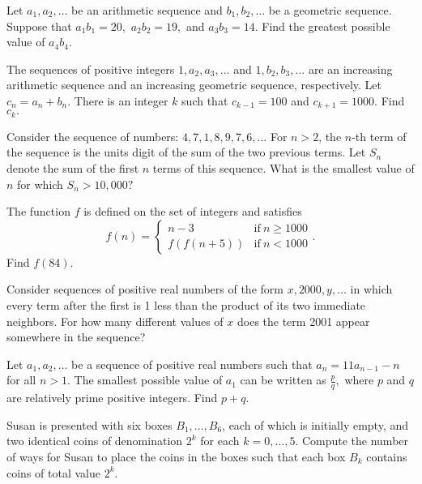 \documentclass[blue,onecol]{shooting}
\begin{document}
\begin{prob}[HMMT 2019]{3}
Let $a_1,a_2,\dots$ be an arithmetic sequence and $b_1,b_2,\dots$ be a geometric sequence. Suppose that $a_1b_1=20,$ $a_2b_2=19,$ and $a_3b_3=14.$ Find the greatest possible value of $a_4b_4.$
\end{prob}

\begin{prob}[AIME II 2016/9]{3}
The sequences of positive integers $1,a_2, a_3,...$ and $1,b_2, b_3,...$ are an increasing arithmetic sequence and an increasing geometric sequence, respectively. Let $c_n=a_n+b_n$. There is an integer $k$ such that $c_{k-1}=100$ and $c_{k+1}=1000$. Find $c_k.$
\end{prob}

\begin{prob}[AMC 12A 2002/21]{4}
Consider the sequence of numbers: $4,7,1,8,9,7,6,\dots$ For $n>2$, the $n$-th term of the sequence is the units digit of the sum of the two previous terms. Let $S_n$ denote the sum of the first $n$ terms of this sequence. What is the smallest value of $n$ for which $S_n>10,000?$
\end{prob}

\begin{prob}[AIME 1984/7]{4}
The function $f$ is defined on the set of integers and satisfies
\[f(n)=\begin{cases} n-3&\mbox{if}\ n\ge 1000\\ f(f(n+5))&\mbox{if}\ n<1000\end{cases}.\]
Find $f(84).$
\end{prob}
    
\begin{prob}[AMC 12A 2001/25]{4}
Consider sequences of positive real numbers of the form $x, 2000, y, \dots$ in which every term after the first is 1 less than the product of its two immediate neighbors. For how many different values of $x$ does the term 2001 appear somewhere in the sequence?
\end{prob}

\begin{req}[PUMaC 2017]{4}
Let $a_1,a_2,\dots$ be a sequence of positive real numbers such that $a_n=11a_{n-1}-n$ for all $n>1.$ The smallest possible value of $a_1$ can be written as $\frac{p}{q},$ where $p$ and $q$ are relatively prime positive integers. Find $p+q.$
\end{req}
    
\begin{req}[OMO 2019]{6}
Susan is presented with six boxes $B_1, \dots, B_6$, each of which is initially empty, and two identical coins of denomination $2^k$ for each $k = 0, \dots, 5$. Compute the number of ways for Susan to place the coins in the boxes such that each box $B_k$ contains coins of total value $2^k.$
\end{req}
\end{document}
